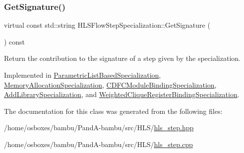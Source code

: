 \mbox{\label{classHLSFlowStepSpecialization_ae8c6ce8a3495c93e8a8edc01d8727023}} 
\subsubsection{\texorpdfstring{Get\+Signature()}{GetSignature()}}
{\footnotesize\ttfamily virtual const std\+::string H\+L\+S\+Flow\+Step\+Specialization\+::\+Get\+Signature (\begin{DoxyParamCaption}{ }\end{DoxyParamCaption}) const\hspace{0.3cm}{\ttfamily [pure virtual]}}



Return the contribution to the signature of a step given by the specialization. 



Implemented in \hyperlink{classParametricListBasedSpecialization_ab4a9c8147842a19814c43444a8d502d6}{Parametric\+List\+Based\+Specialization}, \hyperlink{classMemoryAllocationSpecialization_a539bd1789baf2ecf8db545a3ea80855a}{Memory\+Allocation\+Specialization}, \hyperlink{classCDFCModuleBindingSpecialization_a2e211cebee02224677080272887e4cca}{C\+D\+F\+C\+Module\+Binding\+Specialization}, \hyperlink{classAddLibrarySpecialization_ab2e29e010e6b3e2a708539770e5de646}{Add\+Library\+Specialization}, and \hyperlink{classWeightedCliqueRegisterBindingSpecialization_abced50010cc1e667c05ab536e61edebd}{Weighted\+Clique\+Register\+Binding\+Specialization}.



The documentation for this class was generated from the following files\+:\begin{DoxyCompactItemize}
\item 
/home/osboxes/bambu/\+Pand\+A-\/bambu/src/\+H\+L\+S/\hyperlink{hls__step_8hpp}{hls\+\_\+step.\+hpp}\item 
/home/osboxes/bambu/\+Pand\+A-\/bambu/src/\+H\+L\+S/\hyperlink{hls__step_8cpp}{hls\+\_\+step.\+cpp}\end{DoxyCompactItemize}
